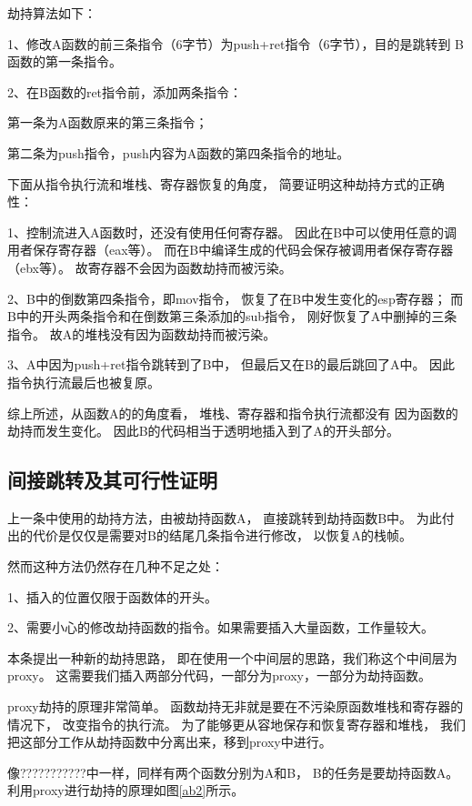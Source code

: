劫持算法如下：

1、修改A函数的前三条指令（6字节）为push+ret指令（6字节），目的是跳转到
B函数的第一条指令。

2、在B函数的ret指令前，添加两条指令：

第一条为A函数原来的第三条指令；

第二条为push指令，push内容为A函数的第四条指令的地址。

下面从指令执行流和堆栈、寄存器恢复的角度，
简要证明这种劫持方式的正确性：

1、控制流进入A函数时，还没有使用任何寄存器。
因此在B中可以使用任意的调用者保存寄存器（eax等）。
而在B中编译生成的代码会保存被调用者保存寄存器（ebx等）。
故寄存器不会因为函数劫持而被污染。

2、B中的倒数第四条指令，即mov指令，
恢复了在B中发生变化的esp寄存器；
而B中的开头两条指令和在倒数第三条添加的sub指令，
刚好恢复了A中删掉的三条指令。
故A的堆栈没有因为函数劫持而被污染。

3、A中因为push+ret指令跳转到了B中，
但最后又在B的最后跳回了A中。
因此指令执行流最后也被复原。

综上所述，从函数A的的角度看，
堆栈、寄存器和指令执行流都没有
因为函数的劫持而发生变化。
因此B的代码相当于透明地插入到了A的开头部分。

\subsection{间接跳转及其可行性证明}

上一条中使用的劫持方法，由被劫持函数A，
直接跳转到劫持函数B中。
为此付出的代价是仅仅是需要对B的结尾几条指令进行修改，
以恢复A的栈帧。

然而这种方法仍然存在几种不足之处：

1、插入的位置仅限于函数体的开头。

2、需要小心的修改劫持函数的指令。如果需要插入大量函数，工作量较大。

本条提出一种新的劫持思路，
即在使用一个中间层的思路，我们称这个中间层为proxy。
这需要我们插入两部分代码，一部分为proxy，一部分为劫持函数。

proxy劫持的原理非常简单。
函数劫持无非就是要在不污染原函数堆栈和寄存器的情况下，
改变指令的执行流。
为了能够更从容地保存和恢复寄存器和堆栈，
我们把这部分工作从劫持函数中分离出来，移到proxy中进行。

像???????????中一样，同样有两个函数分别为A和B，
B的任务是要劫持函数A。
利用proxy进行劫持的原理如图\ref{ab2}所示。

